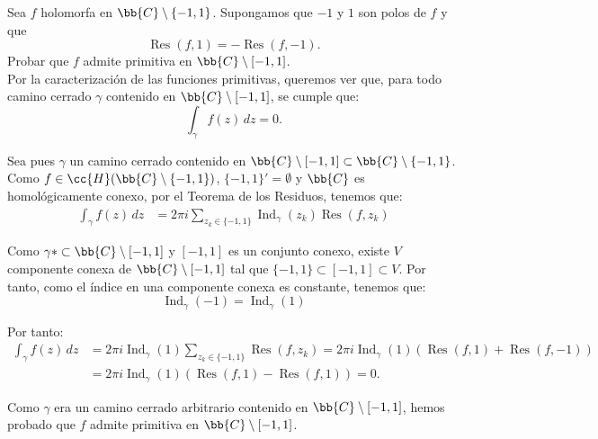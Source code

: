\documentclass[12pt]{article}
\DeclareMathOperator{\Ind}{Ind}
\DeclareMathOperator{\Res}{Res}
\begin{document}
    \begin{ejercicio}[2.5 puntos]
        Sea $f$ holomorfa en $\bb{C}\setminus\{-1, 1\}$. Supongamos que $-1$ y $1$ son polos de $f$ y que
        \[
            \Res(f, 1) = -\Res(f, -1).
        \]
        Probar que $f$ admite primitiva en $\bb{C} \setminus [-1, 1]$.\\

        Por la caracterización de las funciones primitivas, queremos ver que, para todo camino cerrado $\gamma$ contenido en $\bb{C}\setminus [-1, 1]$, se cumple que:
        \begin{equation*}
            \int_{\gamma} f(z) \, dz = 0.
        \end{equation*}

        Sea pues $\gamma$ un camino cerrado contenido en $\bb{C}\setminus [-1, 1]\subset \bb{C}\setminus \{-1, 1\}$. Como $f\in \cc{H}(\bb{C}\setminus \{-1, 1\})$, $\{-1,1\}'=\emptyset$ y $\bb{C}$ es homológicamente conexo, por el Teorema de los Residuos, tenemos que:
        \begin{align*}
            \int_{\gamma} f(z) \, dz &= 2\pi i \sum_{z_k\in \{-1, 1\}} \Ind_{\gamma}(z_k) \Res(f, z_k)
        \end{align*}

        Como $\gamma*\subset \bb{C}\setminus [-1, 1]$ y $[-1,1]$ es un conjunto conexo, existe $V$ componente conexa de $\bb{C}\setminus [-1, 1]$ tal que $\{-1,1\}\subset [-1,1]\subset V$. Por tanto, como el índice en una componente conexa es constante, tenemos que:
        \begin{equation*}
            \Ind_{\gamma}(-1) = \Ind_{\gamma}(1)
        \end{equation*}

        Por tanto:
        \begin{align*}
            \int_{\gamma} f(z) \, dz &= 2\pi i \Ind_{\gamma}(1) \sum_{z_k\in \{-1, 1\}}\Res(f, z_k)
            = 2\pi i \Ind_{\gamma}(1) \left(\Res(f, 1) + \Res(f, -1)\right)\\
            &= 2\pi i \Ind_{\gamma}(1) \left(\Res(f, 1) - \Res(f, 1)\right) = 0.
        \end{align*}

        Como $\gamma$ era un camino cerrado arbitrario contenido en $\bb{C}\setminus [-1, 1]$, hemos probado que $f$ admite primitiva en $\bb{C}\setminus [-1, 1]$.
    \end{ejercicio}
\end{document}
